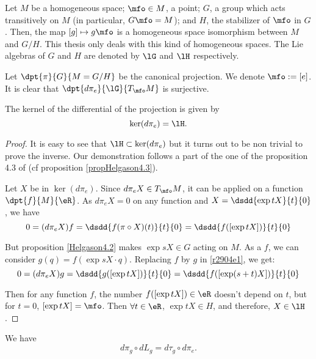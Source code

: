  Let $M$ be a homogeneous space; $\mfo\in M$, a point; $G$, a group which acts transitively on $M$ (in particular, $G\mfo=M$); and $H$, the stabilizer of $\mfo$ in $G$. Then, the map $[g]\mapsto g\mfo$ is a homogeneous space isomorphism between $M$ and $G/H$. This thesis only deals with this kind of homogeneous spaces. The Lie algebras of $G$ and $H$ are denoted by $\lG$ and $\lH$ respectively.


Let $\dpt{\pi}{G}{M=G/H}$ be the canonical projection. We denote $\mfo:=[e]$. It is clear that $\dpt{d\pi_e}{\lG}{T_{\mfo}M}$ is surjective.
\begin{proposition}
	The kernel of the differential of the projection is given by
	\begin{equation}
 		\ker(d\pi_e)=\lH.
	\end{equation}
\end{proposition}

\begin{proof}
It is easy to see that $\lH\subset \ker(d\pi_e)$ but it turns out to be non trivial to prove the inverse. Our demonstration follows a part of the one of the proposition 4.3 of \cite{Helgason} (cf proposition \ref{propHelgason4.3}).

Let $X$ be in $\ker(d\pi_e)$. Since $d\pi_eX\in T_{\mfo}M$, it can be applied on a function $\dpt{f}{M}{\eR}$. As $d\pi_eX=0$ on any function and $X=\dsdd{\exp tX}{t}{0}$, we have
\begin{equation}
   0=(d\pi_eX)f=\dsdd{f(\pi\circ X)(t)}{t}{0}
               =\dsdd{f([\exp tX])}{t}{0}                      \label{r2904e1}
\end{equation}

But proposition \ref{Helgason4.2} makes $\exp sX\in G$ acting on $M$. As a $f$, we can consider $g(q)=f(\exp sX\cdot q)$. Replacing $f$  by $g$ in \eqref{r2904e1}, we get:
\begin{equation}
   0=(d\pi_eX)g=\dsdd{g([\exp tX])}{t}{0}
               =\dsdd{f([\exp(s+t)X])}{t}{0}
\end{equation}

Then for any function $f$, the number $f([\exp tX])\in\eR$ doesn't depend on $t$, but for $t=0$, $[\exp tX]=\mfo$. Then $\forall t\in\eR$, $\exp tX\in H$, and therefore, $X\in \lH$.
\end{proof}

\begin{lemma}
	We have
	\begin{equation}  \label{Eqdpigdtaudpi}
		d\pi_g\circ dL_g=d\tau_g\circ d\pi_e.
	\end{equation}
\end{lemma}

